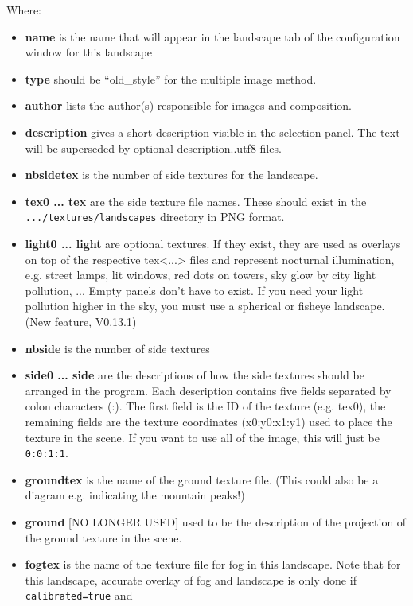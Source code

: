 Where:

\begin{itemize}
\item
  \textbf{name} is the name that will appear in the landscape tab of the
  configuration window for this landscape
\item
  \textbf{type} should be ``old\_style'' for the multiple image method.
\item
  \textbf{author} lists the author(s) responsible for images and
  composition.
\item
  \textbf{description} gives a short description visible in the
  selection panel. The text will be superseded by optional
  description..utf8 files.
\item
  \textbf{nbsidetex} is the number of side textures for the landscape.
\item
  \textbf{tex0 ... tex} are the side texture file names. These should
  exist in the \texttt{.../textures/landscapes} directory in PNG format.
\item
  \textbf{light0 ... light} are optional textures. If they exist, they
  are used as overlays on top of the respective
  tex\textless{}...\textgreater{} files and represent nocturnal
  illumination, e.g. street lamps, lit windows, red dots on towers, sky
  glow by city light pollution, ... Empty panels don't have to exist. If
  you need your light pollution higher in the sky, you must use a
  spherical or fisheye landscape. (New feature, V0.13.1)
\item
  \textbf{nbside} is the number of side textures
\item
  \textbf{side0 ... side} are the descriptions of how the side textures
  should be arranged in the program. Each description contains five
  fields separated by colon characters (:). The first field is the ID of
  the texture (e.g. tex0), the remaining fields are the texture
  coordinates (x0:y0:x1:y1) used to place the texture in the scene. If
  you want to use all of the image, this will just be \texttt{0:0:1:1}.
\item
  \textbf{groundtex} is the name of the ground texture file. (This could
  also be a diagram e.g. indicating the mountain peaks!)
\item
  \textbf{ground} {[}NO LONGER USED{]} used to be the description of the
  projection of the ground texture in the scene.
\item
  \textbf{fogtex} is the name of the texture file for fog in this
  landscape. Note that for this landscape, accurate overlay of fog and
  landscape is only done if \texttt{calibrated=true} and

\end{itemize}
